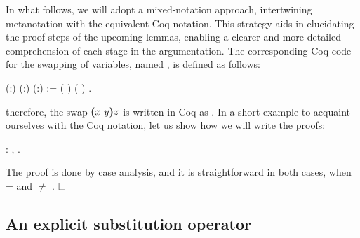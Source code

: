 In what follows, we will adopt a mixed-notation approach, intertwining metanotation with the equivalent Coq notation. This strategy aids in elucidating the proof steps of the upcoming lemmas, enabling a clearer and more detailed comprehension of each stage in the argumentation. The corresponding Coq code for the swapping of variables, named , is defined as follows: 
\begin{coqdoccode}
\coqdocemptyline
\coqdocnoindent
{}  (:) (:) (:) :=  ( \coqdocnotation{==} )     ( \coqdocnotation{==} )    .\coqdoceol
\coqdocemptyline
\end{coqdoccode}
\noindent therefore, the swap $(\!\!(x\ y)\!\!) z$ is written in Coq as    . In a short example to acquaint ourselves with the Coq notation, let us show how we will write the proofs:
\begin{coqdoccode}
\coqdocemptyline
\coqdocnoindent
{} : \coqdockw{\ensuremath{\forall}}  ,      .\coqdoceol
\end{coqdoccode}
 The proof is done by case analysis, and it is straightforward in both cases, when  =  and  \ensuremath{\not=} . $\hfill\Box$ 
\begin{coqdoccode}
\coqdocemptyline
\end{coqdoccode}
\subsection{An explicit substitution operator}



